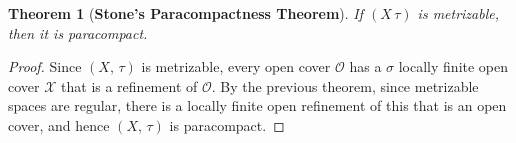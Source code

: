 \documentclass{article}
\theoremstyle{plain}
\newtheorem{theorem}{Theorem}[section]
\theoremstyle{normal}
\begin{document}
        \begin{theorem}[\textbf{Stone's Paracompactness Theorem}]
            If $(X\,\tau)$ is metrizable, then it is paracompact.
        \end{theorem}
        \begin{proof}
            Since $(X,\,\tau)$ is metrizable, every open cover $\mathcal{O}$
            has a $\sigma$ locally finite open cover $\mathcal{X}$ that is a
            refinement of $\mathcal{O}$. By the previous theorem, since
            metrizable spaces are regular, there is a locally finite open
            refinement of this that is an open cover, and hence $(X,\,\tau)$
            is paracompact.
        \end{proof}
\end{document}
